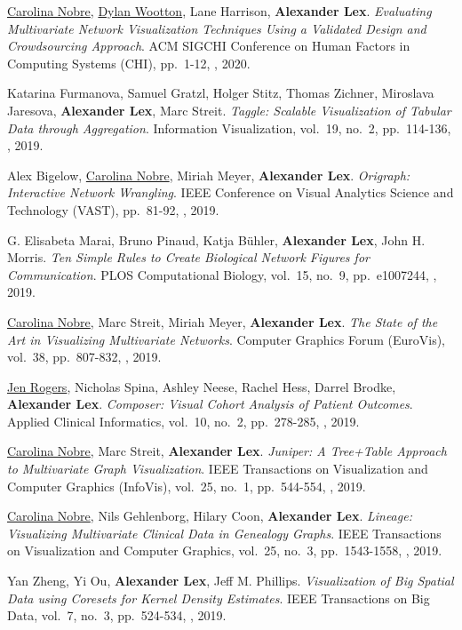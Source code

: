 \item \uline{Carolina Nobre}, \uline{Dylan Wootton}, Lane Harrison, \textbf{Alexander Lex}. \textit{Evaluating Multivariate Network Visualization Techniques Using a Validated Design and Crowdsourcing Approach}. ACM SIGCHI Conference on Human Factors in Computing Systems (CHI), pp.\ 1-12, , 2020. 
\item Katarina Furmanova, Samuel Gratzl, Holger Stitz, Thomas Zichner, Miroslava Jaresova, \textbf{Alexander Lex}, Marc Streit. \textit{Taggle: Scalable Visualization of Tabular Data through Aggregation}. Information Visualization, vol.\ 19, no.\ 2, pp.\ 114-136, , 2019. 
\item Alex Bigelow, \uline{Carolina Nobre}, Miriah Meyer, \textbf{Alexander Lex}. \textit{Origraph: Interactive Network Wrangling}.  IEEE Conference on Visual Analytics Science and Technology (VAST), pp.\ 81-92, , 2019. 
\item G. Elisabeta Marai, Bruno Pinaud, Katja Bühler, \textbf{Alexander Lex}, John H. Morris. \textit{Ten Simple Rules to Create Biological Network Figures for Communication}. PLOS Computational Biology, vol.\ 15, no.\ 9, pp.\ e1007244, , 2019. 
\item \uline{Carolina Nobre}, Marc Streit, Miriah Meyer, \textbf{Alexander Lex}. \textit{The State of the Art in Visualizing Multivariate Networks}. Computer Graphics Forum (EuroVis), vol.\ 38, pp.\ 807-832, , 2019. 
\item \uline{Jen Rogers}, Nicholas Spina, Ashley Neese, Rachel Hess, Darrel Brodke, \textbf{Alexander Lex}. \textit{Composer: Visual Cohort Analysis of Patient Outcomes}. Applied Clinical Informatics, vol.\ 10, no.\ 2, pp.\ 278-285, , 2019. 
\item \uline{Carolina Nobre}, Marc Streit, \textbf{Alexander Lex}. \textit{Juniper: A Tree+Table Approach to Multivariate Graph Visualization}. IEEE Transactions on Visualization and Computer Graphics (InfoVis), vol.\ 25, no.\ 1, pp.\ 544-554, , 2019. 
\item \uline{Carolina Nobre}, Nils Gehlenborg, Hilary Coon, \textbf{Alexander Lex}. \textit{Lineage: Visualizing Multivariate Clinical Data in Genealogy Graphs}. IEEE Transactions on Visualization and Computer Graphics, vol.\ 25, no.\ 3, pp.\ 1543-1558, , 2019. 
\item Yan Zheng, Yi Ou, \textbf{Alexander Lex}, Jeff M. Phillips. \textit{Visualization of Big Spatial Data using Coresets for Kernel Density Estimates}. IEEE Transactions on Big Data, vol.\ 7, no.\ 3, pp.\ 524-534, , 2019. 

